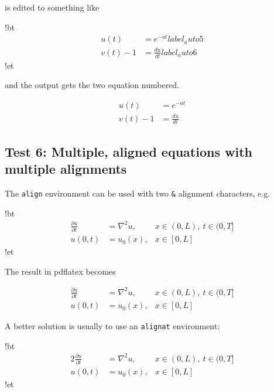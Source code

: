 \documentclass[%
oneside,                 %
final,                   %
10pt]{article}
\begin{document}
\elatexcod

is edited to something like










\blatexcod
!bt
\begin{align}
u(t)&=e^{-at}
label{_auto5}\\ 
v(t) - 1 &= \frac{du}{dt}
label{_auto6}
\end{align}
!et

\elatexcod

and the output gets the two equation numbered.

\begin{align}
u(t)&=e^{-at}\\ 
v(t) - 1 &= \frac{du}{dt}
\end{align}

\subsection{Test 6: Multiple, aligned equations with multiple alignments}

The \texttt{align} environment can be used with two \Verb!&! alignment characters, e.g. 









\blatexcod
!bt
\begin{align}
\frac{\partial u}{\partial t} &= \nabla^2 u, & x\in (0,L),
\ t\in (0,T]\\ 
u(0,t) &= u_0(x), & x\in [0,L]
\end{align}
!et

\elatexcod

The result in pdflatex becomes

\begin{align}
\frac{\partial u}{\partial t} &= \nabla^2 u, & x\in (0,L),
\ t\in (0,T]\\ 
u(0,t) &= u_0(x), & x\in [0,L]
\end{align}

A better solution is usually to use an \texttt{alignat} environment:









\blatexcod
!bt
\begin{alignat}{2}
\frac{\partial u}{\partial t} &= \nabla^2 u, & x\in (0,L),
\ t\in (0,T]\\ 
u(0,t) &= u_0(x), & x\in [0,L]
\end{alignat}
!et
\end{document}
